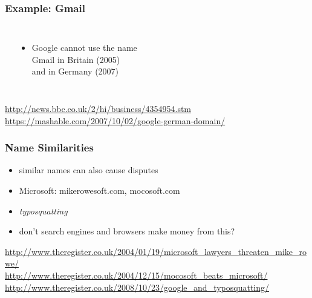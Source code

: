 \documentclass[dvipsnames]{beamer}
\theoremstyle{plain}
\begin{document}
\begin{frame}
  \frametitle{Example: Gmail}

  \begin{columns}
    \begin{center}
    \end{center}

    \begin{itemize}
      \item Google cannot use the name\\
        Gmail in Britain (2005)\\
        and in Germany (2007)
    \end{itemize}
  \end{columns}

  \medskip
  \tiny{\url{http://news.bbc.co.uk/2/hi/business/4354954.stm}}\\
  \tiny{\url{https://mashable.com/2007/10/02/google-german-domain/}}\\
\end{frame}

\begin{frame}
  \frametitle{Name Similarities}

  \begin{itemize}
    \item similar names can also cause disputes
    \item Microsoft: mikerowesoft.com, mocosoft.com

    \pause
    \bigskip
    \item \emph{typosquatting}
    \item don't search engines and browsers make money from this?
  \end{itemize}

  \medskip
  \tiny{\url{http://www.theregister.co.uk/2004/01/19/microsoft_lawyers_threaten_mike_rowe/}}\\
  \tiny{\url{http://www.theregister.co.uk/2004/12/15/mocosoft_beats_microsoft/}}\\
  \tiny{\url{http://www.theregister.co.uk/2008/10/23/google_and_typosquatting/}}\\
\end{frame}
\end{document}

